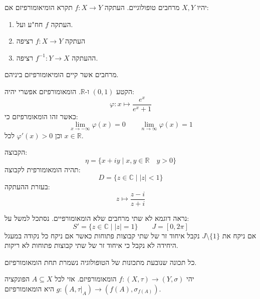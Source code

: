 \documentclass{tstextbook}
\begin{document}
\begin{definition}[הומאומורפיזם]
יהיו \(X,Y\) מרחבים טופולוגיים. העתקה \(f:X\to Y\) תקרא הומיאומורפיזם אם:

  \begin{enumerate}
    \item העתקה \(f\) חח"ע ועל. 


    \item העתקה \(f:X\to Y\) רציפה 


    \item ההעתקה \(f^{-1}:Y\to X\) רציפה. 


  \end{enumerate}
\end{definition}
\begin{definition}
מרחבים אשר קיים הומיאומורפיזם ביניהם.

\end{definition}
\begin{example}
הקטע \((0,1)\) ו-\(\mathbb{R}\). הומאומורפיזם אפשרי יהיה:
$$\varphi:x\mapsto \frac{e^{ x }}{e^{ x }+1}$$
כאשר זהו הומאומרפיזם כי:
$$\lim_{ x \to -\infty } \varphi(x)=0\qquad \lim_{ n \to \infty } \varphi(x)=1$$
וכן \(\varphi'(x)> 0\) לכל \(x \in \mathbb{R}\).

\end{example}
\begin{example}
הקבוצה:
$$\eta=\{ x+iy \mid  x,y \in \mathbb{R}\quad y> 0\}$$
תהיה הומאומורפית לקבוצה:
$$D=\{ z \in \mathbb{C}\mid  \lvert z \rvert < 1 \}$$
בעזרת ההעתקה:
$$z\mapsto \frac{z-i}{z+i}$$

\end{example}
\begin{example}
נראה דוגמא לא שתי מרחבים שלא הומאומורפיים. נסתכל למשל על:
$$S'=\{ z \in \mathbb{C}\mid \lvert z \rvert =1 \}\qquad J=[0,2\pi]$$
אם ניקח את \(J\setminus \{ 1 \}\) נקבל איחוד זר של שתי קבוצות פתוחות כאשר אם ניקח כל נקודה במעגל היחידה לא נקבל כי איחוד זר של שתי קבוצות פתוחות לא ריקות.

\end{example}
\begin{remark}
כל תכונה שנובעת מתכונות של הטופולוגיה נשמרת תחת הומאומורפיזם.

\end{remark}
\begin{proposition}
יהי \(f:(X,\tau)\to (Y,\sigma)\) הומאומורפיזם. אזי לכל \(A\subseteq X\) הפונקציה \(g:(A,\tau|_{A})\to(f(A),\sigma_{f(A)})\) היא הומאומורפיזם.

\end{proposition}
\end{document}
